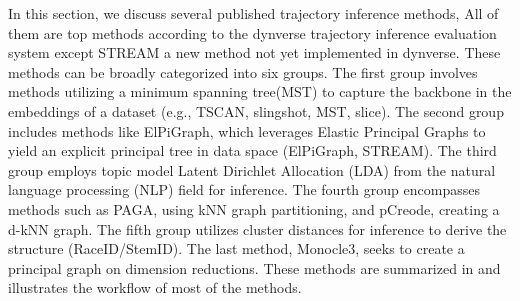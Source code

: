 In this section, we discuss several published trajectory inference methods, All of them are top methods according to the dynverse trajectory inference evaluation system\citep{saelens2019comparison} except STREAM a new method not yet implemented in dynverse. These methods can be broadly categorized into six groups. The first group involves methods utilizing a minimum spanning tree(MST) to capture the backbone in the embeddings of a dataset (e.g., TSCAN, slingshot, MST, slice). The second group includes methods like ElPiGraph, which leverages Elastic Principal Graphs to yield an explicit principal tree in data space (ElPiGraph, STREAM). The third group employs topic model Latent Dirichlet Allocation (LDA) from the natural language processing (NLP) field for inference. The fourth group encompasses methods such as PAGA, using kNN graph partitioning, and pCreode, creating a d-kNN graph. The fifth group utilizes cluster distances for inference to derive the structure (RaceID/StemID). The last method, Monocle3, seeks to create a principal graph on dimension reductions. These methods are summarized in  and  illustrates the workflow of most of the methods.
